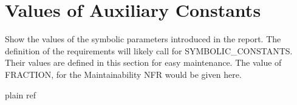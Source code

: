 \documentclass[12pt]{article}
\begin{document}
\section{Values of Auxiliary Constants}
Show the values of the symbolic parameters introduced in the report. The definition of the requirements will likely call for SYMBOLIC\_CONSTANTS. Their values are defined in this section for easy maintenance. The value of FRACTION, for the Maintainability NFR would be given here.

\newpage
 {plain}
 {ref}

\newpage
\end{document}
